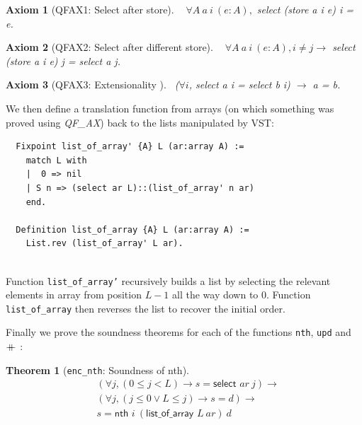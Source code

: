 \documentclass[onecolumn, preprint]{sigplanconf}
\newcommand{\select}[2]{\textsf{select } #1\ #2}
\newcommand{\loa}[2]{\textsf{list\_of\_array } #1\ #2}
\newcommand{\nth}[3]{\textsf{nth } #1\ #2\ #3}
\newcommand\doubleplus{+\kern-1.3ex+\kern0.8ex}
\newtheorem{theorem}{Theorem}
\newtheorem{axiom}{Axiom}
\begin{document}
\begin{axiom}[QFAX1: Select after store] \ \newline 
$\forall A\ a\ i\ (e:A),$ select (store a i e) i = e.
\end{axiom}

\begin{axiom}[QFAX2: Select after different store] \ \newline
$\forall A\ a\ i\ (e:A),  i\not = j \rightarrow$  select (store a i e) j = select a j.
\end{axiom}

\begin{axiom}[QFAX3: Extensionality ] \
\newline ($\forall i$, select a i = select b i) $\rightarrow$ a = b.  
\end{axiom}

We then define a translation function from arrays (on which something was proved using \emph{QF\_AX}) back to the lists manipulated by VST:

\begin{lstlisting}
  Fixpoint list_of_array' {A} L (ar:array A) :=
    match L with
    |  0 => nil
    | S n => (select ar L)::(list_of_array' n ar)
    end.

  Definition list_of_array {A} L (ar:array A) :=
    List.rev (list_of_array' L ar).
  
\end{lstlisting}

Function \texttt{list\_of\_array'} recursively builds a list by selecting the relevant elements in array from position $L-1$ all the way down to 0. Function \texttt{list\_of\_array} then reverses the list to recover the initial order.

Finally we prove the soundness theorems for each of the functions \texttt{nth}, \texttt{upd} and $\doubleplus$:

\begin{theorem}[\texttt{enc\_nth}: Soundness of \textsf{nth}]

  \begin{align*}
 & (\forall j, (0 \leq j < L) \to s = \select{ar}{j}) \to \\
 & (\forall j, (j \leq 0 \vee L \leq j) \to s = d) \to \\
 & s = \nth{i}{(\loa{L}{ar})}{d} 
\end{align*}

\end{theorem}
\end{document}
